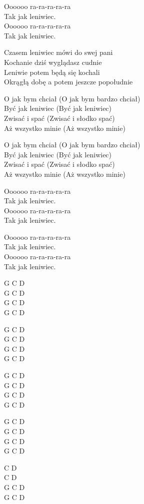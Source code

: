 \begin{text}
Oooooo ra-ra-ra-ra-ra\\
Tak jak leniwiec.\\
Oooooo ra-ra-ra-ra-ra\\
Tak jak leniwiec.

Czasem leniwiec mówi do swej pani\\
Kochanie dziś wyglądasz cudnie\\
Leniwie potem będą się kochali\\
Okrągłą dobę a potem jeszcze popołudnie

O jak bym chciał (O jak bym bardzo chciał)\\
Być jak leniwiec (Być jak leniwiec)\\
Zwisać i spać (Zwisać i słodko spać)\\
Aż wszystko minie (Aż wszystko minie)

O jak bym chciał (O jak bym bardzo chciał)\\
Być jak leniwiec (Być jak leniwiec)\\
Zwisać i spać (Zwisać i słodko spać)\\
Aż wszystko minie (Aż wszystko minie)

Oooooo ra-ra-ra-ra-ra\\
Tak jak leniwiec.\\
Oooooo ra-ra-ra-ra-ra\\
Tak jak leniwiec.

Oooooo ra-ra-ra-ra-ra\\
Tak jak leniwiec.\\
Oooooo ra-ra-ra-ra-ra\\
Tak jak leniwiec.
\end{text}
\begin{chord}
G C D\\
G C D\\
G C D\\
G C D

G C D\\
G C D\\
G C D\\
G C D

G C D\\
G C D\\
G C D\\
G C D

G C D\\
G C D\\
G C D\\
G C D

    \hfill\break
    \hfill\break
    \hfill\break
    \hfill\break

    \hfill\break
    \hfill\break
    \hfill\break
    \hfill\break

    \hfill\break
    \hfill\break
    \hfill\break
    \hfill\break

    \hfill\break
    \hfill\break
    \hfill\break
    \hfill\break

    \hfill\break
    \hfill\break
    \hfill\break
    \hfill\break

C D\\
C D\\
G C D\\
G C D
\end{chord}

